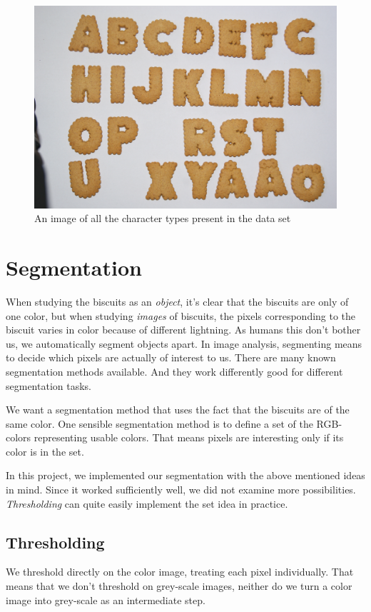 \documentclass[a4paper,11pt]{article}
\begin{document}
\begin{figure}[]
\begin{center}
\includegraphics[width=140mm]{alphabet.JPG}
\end{center}
\caption{An image of all the character types present in the data set}
\label{fig:alphabet}
\end{figure}

\section{Segmentation}

When studying the biscuits as an \emph{object},
it's clear that the biscuits are only of one color,
but when studying \emph{images} of biscuits, 
the pixels corresponding to the biscuit varies in color because of different lightning.
As humans this don't bother us, we automatically segment objects apart.
In image analysis, segmenting means to decide which pixels are actually of interest to us.
There are many known segmentation methods available.
And they work differently good for different segmentation tasks.

We want a segmentation method that uses the fact that the biscuits are of the same color.
One sensible segmentation method is to define a set of the RGB-colors representing usable colors.
That means pixels are interesting only if its color is in the set.

In this project, we implemented our segmentation with the above mentioned ideas in mind.
Since it worked sufficiently well, we did not examine more possibilities. 
\emph{Thresholding} can quite easily implement the set idea in practice.

\subsection{Thresholding}
We threshold directly on the color image, treating each pixel individually. 
That means that we don't threshold on grey-scale images,
neither do we turn a color image into grey-scale as an intermediate step.
\end{document}
